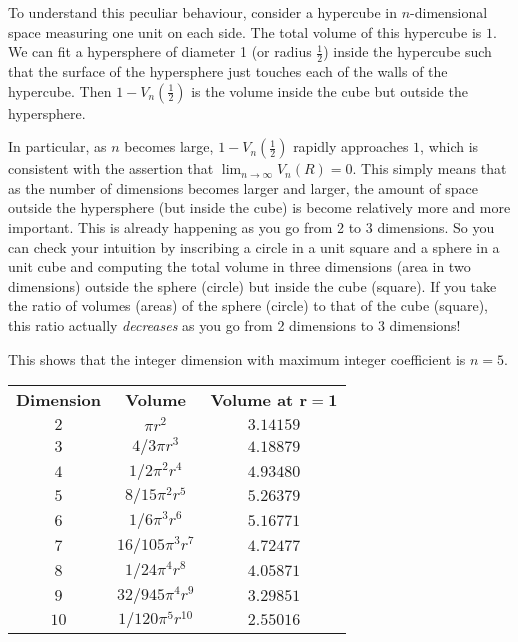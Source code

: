{	To understand this peculiar behaviour, consider a hypercube in $n$-dimensional space measuring one unit on each side.  The total volume of this hypercube is $1$. We can fit a hypersphere of diameter 1 (or radius $\frac{1}{2}$) inside the hypercube such that the surface of the hypersphere just touches each of the walls of the hypercube. Then $1-V_n(\frac{1}{2})$ is the volume inside the cube but outside the hypersphere.  
	
	In particular, as $n$ becomes large, $1-V_n(\frac{1}{2})$ rapidly approaches $1$, which is consistent 	with the assertion that $\lim_{n\to\infty} V_n(R)=0$.  This simply means that as the number of dimensions becomes larger and larger, the amount of space outside the hypersphere (but inside the cube) is become relatively more and more important.  This is already happening as you go from 2 to 3 dimensions.  So you can check your intuition by inscribing a circle in a unit square and a sphere in a unit cube and computing the total volume in three dimensions (area in two dimensions) outside the sphere (circle) but inside the cube (square).  If you take the ratio of volumes (areas) of the sphere (circle) to that of the cube (square), this ratio actually \textit{decreases} as you go from 2 dimensions to 3 dimensions!
	
	This shows that the integer dimension with maximum integer coefficient is $n = 5$. 
	
	\begin{table}[H]
		\centering
		\begin{tabular}{|c|c|c|}
		\rowcolor[HTML]{C0C0C0} 
		\textbf{Dimension} & \textbf{Volume} & \textbf{Volume at $\pmb{r=1}$} \\
		$2$ & $\pi r^2$ & $3.14159$ \\ \hline
		$3$ & $4/3\pi r^3$ & $4.18879$ \\ \hline
		$4$ & $1/2 \pi^2 r^4$ & $4.93480$ \\ \hline
		$5$ & $8/15 \pi^2 r^5$ & $5.26379$ \\ \hline
		$6$ & $1/6 \pi^3 r^6$ & $5.16771$ \\ \hline
		$7$ & $16/105 \pi^3 r^7$ & $4.72477$ \\ \hline
		$8$ & $1/24 \pi^4 r^8$ & $4.05871$ \\ \hline
		$9$ & $32/945 \pi^4 r^9$ & $3.29851$ \\ \hline
		$10$ & $1/120 \pi^5 r^{10}$ & $2.55016$\\ \hline
		\end{tabular}
	\end{table}
	
}
